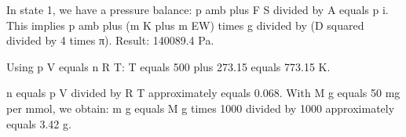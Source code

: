 In state 1, we have a pressure balance:  
p amb plus F S divided by A equals p i.  
This implies p amb plus (m K plus m EW) times g divided by (D squared divided by 4 times π).  
Result: 140089.4 Pa.  

Using p V equals n R T:  
T equals 500 plus 273.15 equals 773.15 K.  

n equals p V divided by R T approximately equals 0.068.  
With M g equals 50 mg per mmol, we obtain:  
m g equals M g times 1000 divided by 1000 approximately equals 3.42 g.